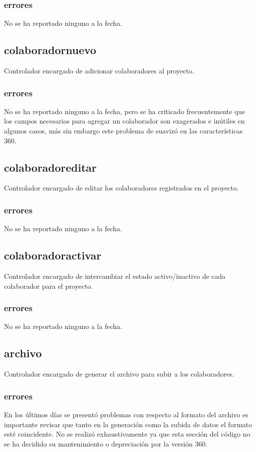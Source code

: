 \documentclass[10pt,a4paper]{book}
\begin{document}
	\subsubsection{errores}
	No se ha reportado ninguno a la fecha.
	
	
	\subsection{colaboradornuevo}
	Controlador encargado de adicionar colaboradores al proyecto.
	\subsubsection{errores}
	No se ha reportado ninguno a la fecha, pero se ha criticado frecuentemente que los campos necesarios para agregar un colaborador son exagerados e inútiles en algunos casos, más sin embargo este problema de suavizó en las características 360.
	
	\subsection{colaboradoreditar}
	Controlador encargado de editar los colaboradores registrados en el proyecto.
	\subsubsection{errores} 
	No se ha reportado ninguno a la fecha.
	
	\subsection{colaboradoractivar}
	Controlador encargado de intercambiar el estado activo/inactivo de cada colaborador para el proyecto.
	\subsubsection{errores}
	No se ha reportado ninguno a la fecha.
	
	\subsection{archivo}
	Controlador encargado de generar el archivo para subir a los colaboradores.
	\subsubsection{errores}\label{e_archivo}
	En los últimos días se presentó problemas con respecto al formato del archivo es importante revisar que tanto en la generación como la subida de datos el formato esté coincidente. No se realizó exhaustivamente ya que esta sección del código no se ha decidido su mantenimiento o depreciación por la versión 360.
\end{document}
